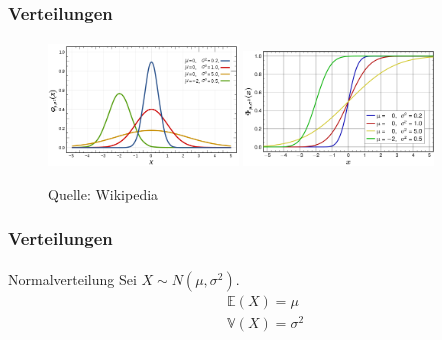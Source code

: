 \documentclass{beamer}
\begin{document}
\begin{frame}
    \frametitle{ Verteilungen}
\framesubtitle{}
\begin{figure}[htp]
      \centering
    \includegraphics[width=0.45\textwidth]{img/normal}
    \includegraphics[width=0.45\textwidth]{img/normaldist}
      \caption{Quelle: Wikipedia}
\end{figure}

 \end{frame}


\begin{frame}
    \frametitle{Verteilungen}
\framesubtitle{}

\begin{block}{Normalverteilung}
Sei $X \sim N(\mu, \sigma^2)$.
\begin{align*}
& \mathbb{E}(X) = \mu \\
& \mathbb{V}(X) = \sigma^2
\end{align*}
\end{block}
 \end{frame}
\end{document}
